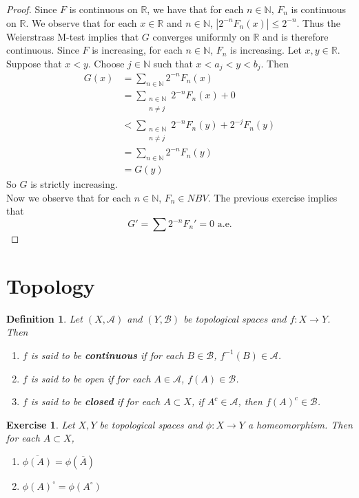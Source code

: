 \documentclass[12pt]{amsart}
\newtheorem{defn}[thm]{Definition}
\newtheorem{ex}[thm]{Exercise}
\newcommand{\N}{\mathbb{N}}
\newcommand{\R}{\mathbb{R}}
\newcommand{\MA}{\mathcal{A}}
\newcommand{\MB}{\mathcal{B}}
\begin{document}
	\begin{proof}
		Since $F$ is continuous on $\R$, we have that for each $n \in \N$, $F_n$ is continuous on $\R$. We observe that for each $x \in \R$ and $n \in \N$, $|2^{-n}F_n(x)| \leq 2^{-n}$. Thus the Weierstrass M-test implies that $G$ converges uniformly on $\R$ and is therefore continuous. Since $F$ is increasing, for each $n \in \N$, $F_n$ is increasing. Let $x, y \in \R$. Suppose that $x<y$. Choose $j \in \N$ such that $x<a_j<y<b_j$. Then 
		\begin{align*}
			G(x) 
			&= \sum_{n \in \N}2^{-n}F_n(x)\\
			&= \sum_{\substack{n \in \N\\ n \neq j}}2^{-n}F_n(x) + 0\\
			& < \sum_{\substack{n \in \N\\ n \neq j}}2^{-n}F_n(y) + 2^{-j}F_n(y)\\
			&=\sum_{n \in \N}2^{-n}F_n(y)\\
			&=G(y)
		\end{align*}
		So $G$ is strictly increasing.\\
		Now we observe that for each $n \in \N$, $F_n \in NBV$. The previous exercise implies that $$G' = \sum 2^{-n}F_n'=0 \text{ a.e.}$$
	\end{proof}
	
	\section{Topology}
	
	\begin{defn}
		Let $(X,\MA)$ and $(Y,\MB)$ be topological spaces and $f:X \rightarrow Y$. Then 
		\begin{enumerate}
			\item $f$ is said to be \textbf{continuous} if for each $B \in \MB$, $f^{-1}(B) \in \MA$.
			\item $f$ is said to be open if for each $A \in \MA$, $f(A) \in \MB$.
			\item $f$ is said to be \textbf{closed} if for each $A \subset X$, if $A^c \in \MA$, then $f(A)^c \in \MB$.
		\end{enumerate}
	\end{defn}

	\begin{ex}
		Let $X, Y$ be topological spaces and $\phi: X \rightarrow Y$ a homeomorphism. Then for each $A \subset X$, 
		\begin{enumerate}
			\item $\overline{\phi(A)} = \phi(\overline{A})$  \item $\phi(A)^{\circ} = \phi(A^{\circ})$  
		\end{enumerate} 
	\end{ex}
\end{document}
